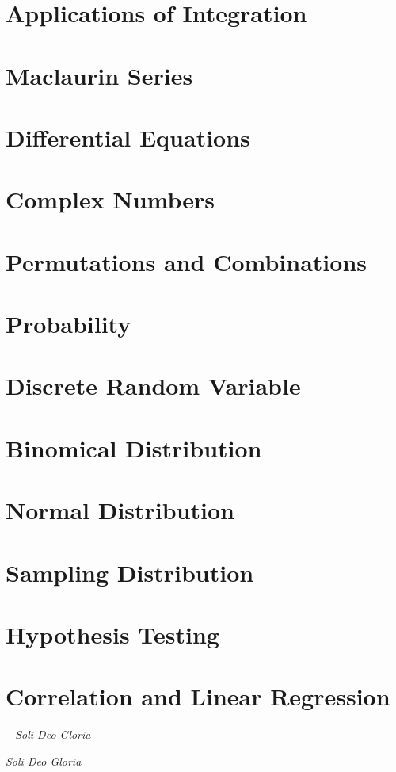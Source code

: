 \documentclass[a4paper]{article}
\begin{document}
\section{Applications of Integration}

\section{Maclaurin Series}

\section{Differential Equations}

\section{Complex Numbers}

\section{Permutations and Combinations}

\section{Probability}

\setcounter{section}{15}
\renewcommand{\thesection}{16A}
\section{Discrete Random Variable}

\renewcommand{\thesection}{16B}
\section{Binomical Distribution}

\renewcommand{\thesection}{\arabic{section}}
\setcounter{section}{16}

\section{Normal Distribution}

\section{Sampling Distribution}

\section{Hypothesis Testing}

\section{Correlation and Linear Regression}


\begin{center}
	\emph{-- Soli Deo Gloria --}
\end{center}


\newpage
\thispagestyle{empty}

\vspace*{\fill}
\begin{center}
	\emph{Soli Deo Gloria}
\end{center}
\vspace*{\fill}
\end{document}
